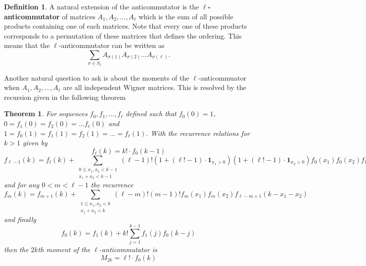 \documentclass[12pt,reqno]{amsart}
\theoremstyle{plain} %
\newtheorem{theorem}{Theorem}[section]
\theoremstyle{remark}
\theoremstyle{definition}
\newtheorem*{defn}{Definition}
\begin{document}
\begin{defn}
A natural extension of the anticommutator is the \textbf{$\ell$-anticommutator} of matrices $A_1,A_2,...,A_\ell$ which is the sum of all possible products containing one of each matrices. Note that every one of these products corresponds to a permutation of these matrices that defines the ordering. This means that the $\ell$-anticommutator can be written as 
\[
\sum_{\sigma\in S_\ell}A_{\sigma(1)}A_{\sigma(2)}...A_{\sigma(\ell)}.
\]
\end{defn}

Another natural question to ask is about the moments of the $\ell$-anticommuator when $A_1,A_2,...,A_\ell$ are all independent Wigner matrices. This is resolved by the recursion given in the following theorem

\begin{theorem}
For sequences $f_0,f_1,...,f_\ell$ defined such that $f_0(0)=1$, $0=f_1(0)=f_2(0)=...f_\ell(0)$ and $1=f_0(1)=f_1(1)=f_2(1)=...=f_\ell(1)$. With the recurrence relations for $k>1$ given by
\[
f_\ell(k)= k!\cdot f_0(k-1)
\]
\[
f_{\ell-1}(k)=f_\ell(k)+\sum_{\substack{0\leq x_1,x_2<k-1\\ x_1+x_2<k-1}} (\ell-1)!(1+(\ell!-1)\cdot \mathbf{1}_{x_1>0})(1+(\ell!-1)\cdot \mathbf{1}_{x_2>0})f_0(x_1)f_0(x_2)f_1(k-x_1-x_2-1)
\]
and for any $0< m<\ell-1$ the recurrence
\[
f_m(k)=f_{m+1}(k)+\sum_{\substack{1\leq x_1,x_2<k\\ x_1+x_2<k}}(\ell-m)!(m-1)!f_m(x_1)f_m(x_2)f_{\ell-m+1}(k-x_1-x_2)
\]
and finally
\[
f_0(k)=f_1(k)+k!\sum_{j=1}^{k-1}f_1(j)f_0(k-j)
\]
then the $2k$th moment of the $\ell$-anticommutator is 
\[
M_{2k}=\ell! \cdot f_0(k)
\]
\end{theorem}
\end{document}

